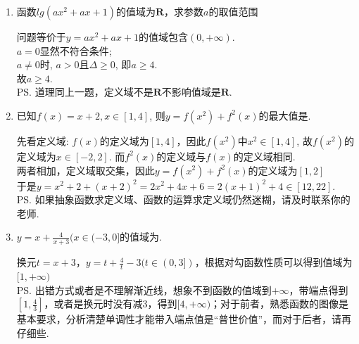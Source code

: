 \begin{enumerate}
\begin{jieda}
\begin{enumerate}
    \item 问题等价于$y=ax^2+ax+1$的值域包含$(0,+\infty)$. \\
    $a=0$显然不符合条件; \\
    $a\neq 0$时, $a>0$且$\Delta\geq0$, 即$a\geq 4$. \\
    故$a\geq 4$. \\
    \ps 学生容易犯两类错误：\\
        1. 误认为当$\sqrt{ax^2+ax+1}$的定义域是$\mathbf{R}$时，其值域是$(0, +\infty)$，从而错误地将问题转化为$\sqrt{ax^2+ax+1}$的定义域是$\mathbf{R}$，要求对应的二次函数开口向上且$\Delta < 0$，得到$[0, 4)$\\
        2. 计算$\Delta \geq 0$之后忘记开口方向的约束，得到$(-\infty, 0] \cup [4, +\infty)$
    \end{enumerate}
    \end{jieda}
    \item 函数$lg(ax^2+ax+1)$的值域为$\mathbf{R}$，求参数$a$的取值范围
    \begin{jieda}
        问题等价于$y=ax^2+ax+1$的值域包含$(0,+\infty)$. \\
        $a=0$显然不符合条件; \\
        $a\neq 0$时, $a>0$且$\Delta\geq0$, 即$a\geq 4$. \\
        故$a\geq 4$. \\
        \ps 道理同上一题，定义域不是$\mathbf{R}$不影响值域是$\mathbf{R}$.
    \end{jieda}
    \item 已知$f(x)=x+2, x\in[1,4]$, 则$y=f(x^2)+f^2(x)$的最大值是. 
    \begin{jieda}
    先看定义域: $f(x)$的定义域为$[1,4]$，因此$f(x^2)$中$x^2\in[1,4]$, 故$f(x^2)$的定义域为$x\in[-2,2]$. 而$f^2(x)$的定义域与$f(x)$的定义域相同.\\
    两者相加，定义域取交集，因此$y=f(x^2)+f^2(x)$的定义域为$[1, 2]$ \\
    于是$y=x^2+2+(x+2)^2=2x^2+4x+6=2(x+1)^2+4\in[12,22]$. \\
    \ps 如果抽象函数求定义域、函数的运算求定义域仍然迷糊，请及时联系你的老师.
    \end{jieda}
    \item $y = x + \frac{4}{x+3} (x \in (-3, 0]$的值域为\blkda{$[1, +\infty)$}.
    \begin{jieda}
        换元$t = x+3$，$y = t+\frac{4}{t}-3 (t \in (0, 3])$，根据对勾函数性质可以得到值域为$[1, +\infty)$ \\
        \ps 出错方式或者是不理解渐近线，想象不到函数的值域到$+\infty$，带端点得到$[1, \frac{4}{3}]$，或者是换元时没有减3，得到$[4, +\infty)$；对于前者，熟悉函数的图像是基本要求，分析清楚单调性才能带入端点值是“普世价值”，而对于后者，请再仔细些.

\end{jieda}
\end{enumerate}

